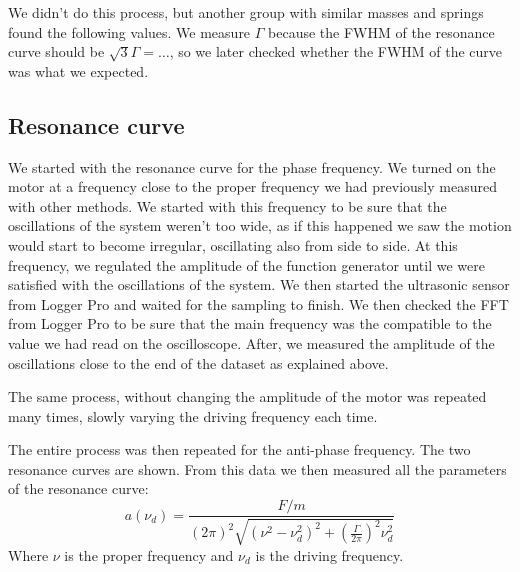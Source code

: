 \documentclass{article}
\begin{document}
We didn't do this process, but another group with similar masses and springs found the following values. 
We measure $\Gamma$ because the FWHM of the resonance curve should be $\sqrt 3 \Gamma = \dots$, so we later checked whether the FWHM of the curve was what we expected.


\subsection{Resonance curve}
We started with the resonance curve for the phase frequency. We turned on the motor at a frequency close to the proper frequency we had previously measured with other methods. We started with this frequency to be sure that the oscillations of the system weren't too wide, as if this happened we saw the motion would start to become irregular, oscillating also from side to side. At this frequency, we regulated the amplitude of the function generator until we were satisfied with the oscillations of the system. We then started the ultrasonic sensor from Logger Pro and waited for the sampling to finish. We then checked the FFT from Logger Pro to be sure that the main frequency was the compatible to the value we had read on the oscilloscope. After, we measured the amplitude of the oscillations close to the end of the dataset as explained above. 

The same process, without changing the amplitude of the motor was repeated many times, slowly varying the driving frequency each time. 

The entire process was then repeated for the anti-phase frequency. The two resonance curves are shown. 
From this data we then measured all the parameters of the resonance curve: 
\begin{equation}
    a (\nu_d) = \frac{F/m}{  (2\pi)^2
                \sqrt{( \nu^2 - \nu_d^2 )^2 +
                \left ( \frac{\Gamma}{2\pi} \right )^2 \nu_d^2}}
\end{equation}  
Where $\nu$ is the proper frequency and $\nu_d$ is the driving frequency.

\end{document}
